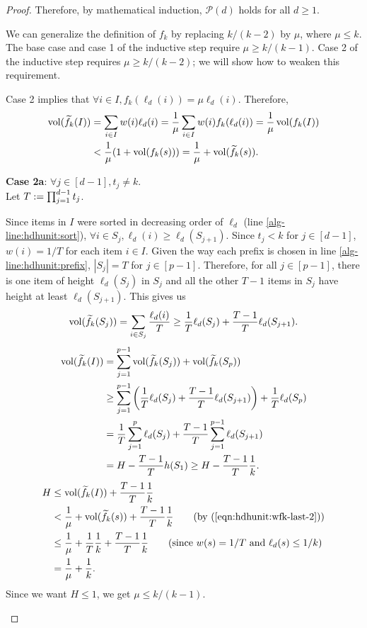 \begin{proof}
Therefore, by mathematical induction, $\mathcal{P}(d)$ holds for all $d \ge 1$.
\begin{optional}
We can generalize the definition of $f_k$ by replacing $k/(k-2)$ by $\mu$, where $\mu \le k$.
The base case and case 1 of the inductive step require $\mu \ge k/(k-1)$.
Case 2 of the inductive step requires $\mu \ge k/(k-2)$;
we will show how to weaken this requirement.

Case 2 implies that $\forall i \in I, f_k(\ell_d(i)) = \mu\ell_d(i)$. Therefore,
\begin{align}
\operatorname{vol}(\widetilde{f}_{k}(I)) &= \sum_{i \in I} w(i)\ell_d(i)
= \frac{1}{\mu} \sum_{i \in I} w(i)f_k(\ell_d(i))
= \frac{1}{\mu} \operatorname{vol}(f_k(I))
\nonumber
\\ \label{eqn:hdhunit:wfk-last-2}
&< \frac{1}{\mu} (1 + \operatorname{vol}(f_k(s)))
= \frac{1}{\mu} + \operatorname{vol}(\widetilde{f}_{k}(s)).
\end{align}

\textbf{Case 2a}: $\forall j \in [d-1], t_j \neq k$.\\
Let $T := \prod_{j=1}^{d-1} t_j$.

Since items in $I$ were sorted in decreasing order of $\ell_d$
(line \ref{alg-line:hdhunit:sort}),
$\forall i \in S_j, \ell_d(i) \ge \ell_d(S_{j+1})$.
Since $t_j < k$ for $j \in [d-1]$, $w(i) = 1/T$ for each item $i \in I$.
Given the way each prefix is chosen in line \ref{alg-line:hdhunit:prefix},
$|S_j| = T$ for $j \in [p-1]$. Therefore, for all $j \in [p-1]$,
there is one item of height $\ell_d(S_j)$ in $S_j$
and all the other $T-1$ items in $S_j$ have height at least $\ell_d(S_{j+1})$.
This gives us
\[ \operatorname{vol}(\widetilde{f}_{k}(S_j)) = \sum_{i \in S_j} \frac{\ell_d(i)}{T}
\ge \frac{1}{T}\ell_d(S_j) + \frac{T-1}{T}\ell_d(S_{j+1}). \]
\begin{align*}
\operatorname{vol}(\widetilde{f}_{k}(I)) &= \sum_{j=1}^{p-1} \operatorname{vol}(\widetilde{f}_{k}(S_j)) + \operatorname{vol}(\widetilde{f}_{k}(S_p))
\\ &\ge \sum_{j=1}^{p-1} \left(\frac{1}{T}\ell_d(S_j) + \frac{T-1}{T}\ell_d(S_{j+1})\right)
    + \frac{1}{T}\ell_d(S_p)
\\ &= \frac{1}{T}\sum_{j=1}^p \ell_d(S_j) + \frac{T-1}{T}\sum_{j=1}^{p-1}\ell_d(S_{j+1})
\\ &= H - \frac{T-1}{T}h(S_1)
\ge H - \frac{T-1}{T}\frac{1}{k}.
\end{align*}
\begin{align*}
H &\le \vol(\wfk(I)) + \frac{T-1}{T}\frac{1}{k}
\\ &< \frac{1}{\mu} + \vol(\wfk(s)) + \frac{T-1}{T}\frac{1}{k}
\tag{by (\ref{eqn:hdhunit:wfk-last-2})}
\\ &\le \frac{1}{\mu} + \frac{1}{T}\frac{1}{k} + \frac{T-1}{T}\frac{1}{k}
\tag{since $w(s) = 1/T$ and $\ell_d(s) \le 1/k$}
\\ &= \frac{1}{\mu} + \frac{1}{k}.
\end{align*}
Since we want $H \le 1$, we get $\mu \le k/(k-1)$.


\end{optional}
\end{proof}
